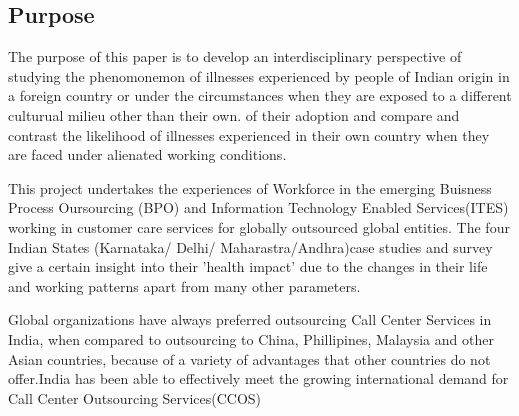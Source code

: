 \subsection{Purpose}

The purpose of this paper is to develop an interdisciplinary perspective of studying the phenomonemon of illnesses experienced by people of Indian origin in a foreign country or under the circumstances when they are exposed to a different culturual milieu other than their own.  of their adoption and compare and contrast the likelihood of illnesses experienced in their own country when they are faced under alienated working conditions. 

This project undertakes the experiences of Workforce in the emerging Buisness Process Oursourcing (BPO) and Information Technology Enabled Services(ITES) working in customer care services for globally outsourced global entities. The four Indian States (Karnataka/ Delhi/ Maharastra/Andhra)case studies and survey give a certain insight into their 'health impact' due to the changes in their life and working patterns apart from many other parameters.

Global organizations have always preferred outsourcing Call Center Services in India, when compared to outsourcing to China, Phillipines, Malaysia and other Asian countries, because of a variety of advantages that other countries do not offer.India has been able to effectively meet the growing international demand for Call Center Outsourcing Services(CCOS)  
    
    
    
    